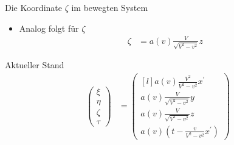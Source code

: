\documentclass[]{beamer}%
\begin{document}
\begin{frame}{Die Koordinate $\zeta$ im bewegten System}
    \begin{itemize}
        \item Analog folgt für $\zeta$
            \begin{align*}
                \zeta     &=   a\left(v\right) 
                                \frac{V}{\sqrt{V^2-v^2}} z
            \end{align*}
    \end{itemize}
\end{frame}

\begin{frame}{Aktueller Stand}
    \begin{align*}
        \begin{pmatrix}
            \xi \\ 
            \eta \\ 
            \zeta\\ 
            \tau 
        \end{pmatrix}
    &=
        \begin{pmatrix*}[l]
            a\left(v\right) \frac{V^2}{V^2-v^2} x^\prime\\
            a\left(v\right) 
                                \frac{V}{\sqrt{V^2-v^2}} y\\
            a\left(v\right) 
                                \frac{V}{\sqrt{V^2-v^2}} z\\
            a\left( v \right) 
                \left( 
                    t-\tfrac{v}{V^2-v^2} x^\prime
                \right)
        \end{pmatrix*}
    \end{align*}
\end{frame}
\end{document}
